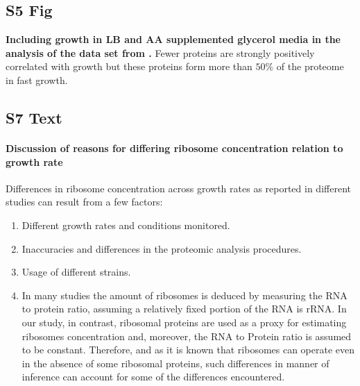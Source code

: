 \documentclass[10pt,letterpaper]{article}
\begin{document}
\subsection*{S5 Fig}
\label{fig:LB}
    {\bf Including growth in LB and AA supplemented glycerol media in the analysis of the data set from \cite{Schmidt2015}.}
Fewer proteins are strongly positively correlated with growth but these proteins form more than $50\%$ of the proteome in fast growth.%

\subsection*{S7 Text}
\label{ribosomeconc}
\paragraph{Discussion of reasons for differing ribosome concentration relation to growth rate}

Differences in ribosome concentration  across growth rates as reported in different studies can result from a few factors:
\begin{enumerate}
\item Different growth rates and conditions monitored.
\item Inaccuracies and differences in the proteomic analysis procedures.
\item Usage of different strains.
\item In many studies the amount of ribosomes is deduced by measuring the RNA to protein ratio, assuming a relatively fixed portion of the RNA is rRNA.
In our study, in contrast, ribosomal proteins are used as a proxy for estimating ribosomes concentration and, moreover, the RNA to Protein ratio is assumed to be constant.
Therefore, and as it is known that ribosomes can operate even in the absence of some ribosomal proteins, such differences in manner of inference can account for some of the differences encountered.
\end{enumerate}
\end{document}
